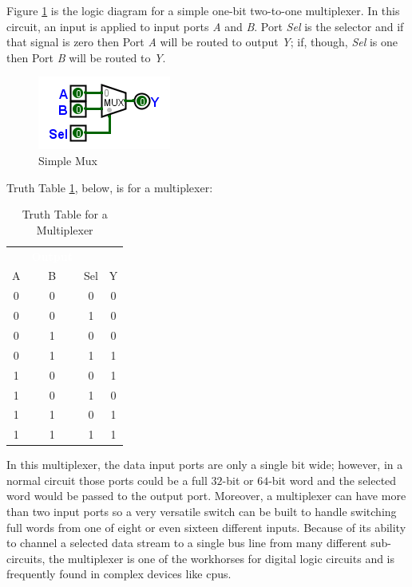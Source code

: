 Figure \ref{fig:08_01} is the logic diagram for a simple one-bit two-to-one multiplexer. In this circuit, an input is applied to input ports \emph{A} and \emph{B}. Port \emph{Sel} is the selector and if that signal is zero then Port \emph{A} will be routed to output \emph{Y}; if, though, \emph{Sel} is one then Port \emph{B} will be routed to \emph{Y}.

\begin{figure}[H]
	\centering
	\includegraphics[width=\maxwidth{.95\linewidth}]{gfx/08_01}
	\caption{Simple Mux}
	\label{fig:08_01}
\end{figure}

Truth Table \ref{tab:08_01}, below, is for a multiplexer:

\begin{table}[H]
  \sffamily
  \newcommand{\head}[1]{\textcolor{white}{\textbf{#1}}}    
  \begin{center}
    \begin{tabular}{cc|cc} 
      \rowcolor{black!75}
      \multicolumn{3}{c}{\head{Inputs}} & \head{Output} \\
      A & B & Sel & Y \\
      \hline
      0 & 0 & 0 & 0 \\
      0 & 0 & 1 & 0 \\
      0 & 1 & 0 & 0 \\
      0 & 1 & 1 & 1 \\
      1 & 0 & 0 & 1 \\
      1 & 0 & 1 & 0 \\
      1 & 1 & 0 & 1 \\
      1 & 1 & 1 & 1 
    \end{tabular}
  \end{center}
  \caption{Truth Table for a Multiplexer}
  \label{tab:08_01}
\end{table}

In this multiplexer, the data input ports are only a single bit wide; however, in a normal circuit those ports could be a full $ 32 $-bit or $ 64 $-bit word and the selected word would be passed to the output port. Moreover, a multiplexer can have more than two input ports so a very versatile switch can be built to handle switching full words from one of eight or even sixteen different inputs. Because of its ability to channel a selected data stream to a single bus line from many different sub-circuits, the multiplexer is one of the workhorses for digital logic circuits and is frequently found in complex devices like \glspl{cpu}.
 
